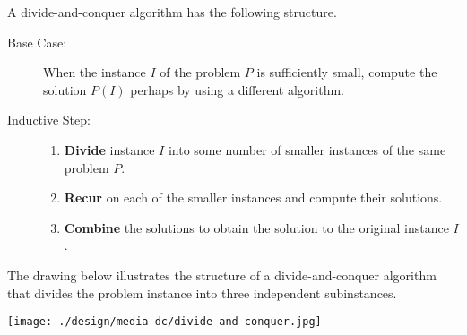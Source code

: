 \begin{flex}
\begin{definition}
A divide-and-conquer algorithm has the following structure.
%
\begin{description}
\item[Base Case:] When the instance $I$ of the problem $P$ is
  sufficiently small, compute the solution $P(I)$ perhaps by using a
  different algorithm.

\item[Inductive Step:]\mbox{}
\begin{enumerate}
\item {\bf Divide} instance $I$ into some number of 
smaller instances of the same problem $P$.
\item {\bf Recur} on each of the smaller instances and compute
  their solutions.
\item {\bf Combine} the solutions to obtain the solution to the
  original instance $I$.
\end{enumerate}
\end{description}
\end{definition}


\begin{example}
The drawing below illustrates the structure of a divide-and-conquer
algorithm that divides the problem instance into three independent
subinstances.

\begin{center}
\texttt{[image: ./design/media-dc/divide-and-conquer.jpg]}
\end{center}
\end{example}
\end{flex}

